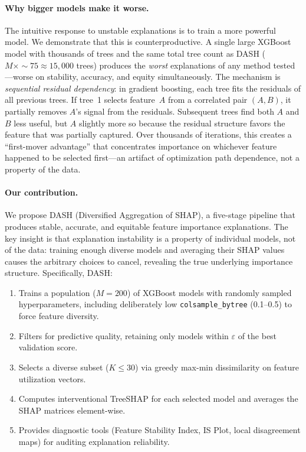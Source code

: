\documentclass[11pt]{article}
\newcommand{\dash}{\textsc{DASH}}
\begin{document}
\paragraph{Why bigger models make it worse.}
The intuitive response to unstable explanations is to train a more powerful
model. We demonstrate that this is counterproductive. A single large
XGBoost model with thousands of trees and the same total tree count as \dash{} ($M \times {\sim}75 \approx 15{,}000$ trees) produces the \emph{worst} explanations of any method
tested---worse on stability, accuracy, and equity simultaneously. The
mechanism is \emph{sequential residual dependency}: in gradient boosting,
each tree fits the residuals of all previous trees. If tree~1 selects
feature~$A$ from a correlated pair $(A, B)$, it partially removes $A$'s
signal from the residuals. Subsequent trees find both $A$ and $B$ less
useful, but $A$ slightly more so because the residual structure favors the
feature that was partially captured. Over thousands of iterations, this
creates a ``first-mover advantage'' that concentrates importance on
whichever feature happened to be selected first---an artifact of
optimization path dependence, not a property of the data.

\paragraph{Our contribution.}
We propose \dash{} (Diversified Aggregation of SHAP), a five-stage
pipeline that produces stable, accurate, and equitable feature importance
explanations. The key insight is that explanation instability is a property
of individual models, not of the data: training enough diverse models and
averaging their SHAP values causes the arbitrary choices to cancel,
revealing the true underlying importance structure. Specifically, \dash{}:

\begin{enumerate}
  \item Trains a population ($M = 200$) of XGBoost models with
    randomly sampled hyperparameters, including deliberately low
    \texttt{colsample\_bytree} (0.1--0.5) to force feature diversity.
  \item Filters for predictive quality, retaining only models within
    $\varepsilon$ of the best validation score.
  \item Selects a diverse subset ($K \leq 30$) via greedy max-min
    dissimilarity on feature utilization vectors.
  \item Computes interventional TreeSHAP for each selected model and
    averages the SHAP matrices element-wise.
  \item Provides diagnostic tools (Feature Stability Index, IS Plot,
    local disagreement maps) for auditing explanation reliability.
\end{enumerate}
\end{document}
